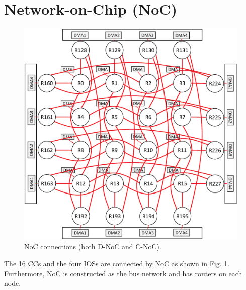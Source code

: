 \section{Network-on-Chip (NoC)}
\label{sec:noc}

\begin{figure}[!htbp]
  \centering
  \includegraphics[width=0.7\linewidth]{../figure/noc_map.eps}
      \caption{\label{fig:noc_map}
    NoC connections (both D-NoC and C-NoC).}
\end{figure}

The 16 CCs and the four IOSs are connected by NoC as shown in Fig. \ref{fig:noc_map}.
Furthermore, NoC is constructed  as the bus network and has routers on each node.

